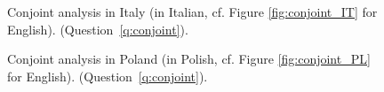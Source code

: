 \begin{figure}[h!]
    \caption[Conjoint analysis in Italy (Italian)]{Conjoint analysis in Italy (in Italian, cf. Figure \ref{fig:conjoint_IT} for English). \hfill (Question~\ref{q:conjoint}).
    }\label{fig:conjoint_IT_original}
\end{figure}

\begin{figure}[h!]
    \caption[Conjoint analysis in Poland (Polish)]{Conjoint analysis in Poland (in Polish, cf. Figure \ref{fig:conjoint_PL} for English). \hfill (Question~\ref{q:conjoint}).
    }\label{fig:conjoint_PL_original}
\end{figure}

